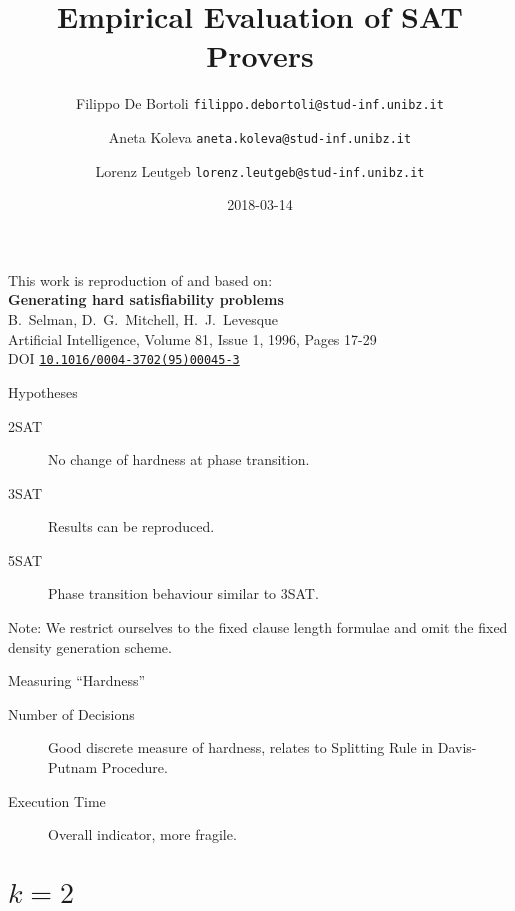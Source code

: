 \documentclass[xcolor={table,usenames,dvipsnames},aspectratio=169]{beamer}
\title{Empirical Evaluation of SAT Provers}
\author{Filippo De Bortoli \texorpdfstring{\newline \texttt{\tiny filippo.debortoli@stud-inf.unibz.it} \newline }{<filippo.debortoli@stud-inf.unibz.it>}%
\and Aneta Koleva \texorpdfstring{\newline \texttt{\tiny aneta.koleva@stud-inf.unibz.it} \newline}{<aneta.koleva@stud-inf.unibz.it>}%
\and Lorenz Leutgeb \texorpdfstring{\newline \texttt{\tiny lorenz.leutgeb@stud-inf.unibz.it} \newline}{<lorenz.leutgeb@stud-inf.unibz.it>}}
\institute{Free University of Bozen-Bolzano}
\date{2018-03-14}
\begin{document}
\begin{frame}[plain]
\maketitle
\end{frame}

\begin{frame}[plain]
This work is reproduction of and based on:\\[6mm]

{\large\bfseries Generating hard satisfiability problems}\\[1mm]
B.\ Selman, D.\ G.\ Mitchell, H.\ J.\ Levesque\\[2mm]
Artificial Intelligence, Volume 81, Issue 1, 1996, Pages 17-29\\[1mm]
DOI \href{http://dx.doi.org/10.1016/0004-3702(95)00045-3}{\texttt{10.1016/0004-3702(95)00045-3}}\\[6mm]
{\small \color{gray}{(detailed reference in the end)}}
\end{frame}

\begin{frame}{Hypotheses}
\begin{description}
	\item[2SAT]{No change of hardness at phase transition.}
	\item[3SAT]{Results can be reproduced.}
	\item[5SAT]{Phase transition behaviour similar to 3SAT.}
\end{description}

\alert{Note:} We restrict ourselves to the fixed clause length formulae and omit the fixed density generation scheme.
\end{frame}

\begin{frame}{Measuring \enquote{Hardness}}
\begin{description}
	\item[Number of Decisions]{Good discrete measure of hardness, relates to \alert{Splitting Rule}  in Davis-Putnam Procedure.}
	\item[Execution Time]{Overall indicator, more fragile.}
\end{description}
\end{frame}

\section{$k = 2$}
\end{document}
